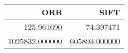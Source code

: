\begin{tabular}{rr}
\toprule
ORB & SIFT \\
\midrule
125.961690 & 74.397471 \\
1025832.000000 & 605893.000000 \\
\bottomrule
\end{tabular}
